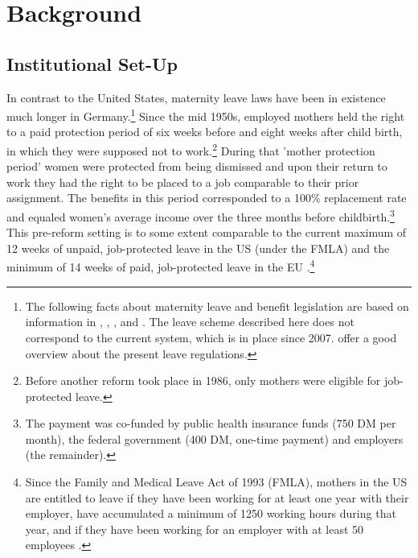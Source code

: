 \documentclass[11pt, a4paper]{article} %
\begin{document}
\bigskip
\section{Background}\label{sec:background}
\subsection[Reform]{Institutional Set-Up}
In contrast to the United States, maternity leave laws have been in existence much longer in Germany.\footnote{The following facts about maternity leave and benefit legislation are based on information in \cite{DIW2002}, \cite{schonberg2014expansions}, \cite{Dustmann2012}, and \cite{zmarzlik1999mutterschutzgesetz}. The leave scheme described here does not correspond to the current system, which is in place since 2007. \cite{Kluve2013} offer a good overview about the present leave regulations.} Since the mid 1950s, employed mothers held the right to a paid protection period of six weeks before and eight weeks after child birth, in which they were supposed not to work.\footnote{Before another reform took place in 1986, only mothers were eligible for job-protected leave.} During that 'mother protection period' women were protected from being dismissed and upon their return to work they had the right to be placed
to a job comparable to their prior assignment. The benefits in this period corresponded to a 100\% replacement rate and equaled women's average income over the three months before childbirth.\footnote{The payment was co-funded by public health insurance funds (750 DM per month), the federal government (400 DM, one-time payment) and employers (the remainder).} This pre-reform setting is to some extent comparable to the current maximum of 12 weeks of unpaid, job-protected leave in the US (under the FMLA) and the minimum of 14 weeks of paid, job-protected leave in the EU \citep{guertzgen2018}.\footnote{Since the Family and Medical Leave Act of 1993 (FMLA), mothers in the US are entitled to leave if they have been working for at least one year with their employer, have accumulated a minimum of 1250 working hours during that year, and if they have been working for an employer with at least 50 employees \citep{baum2003effect}.} \newline
\end{document}
